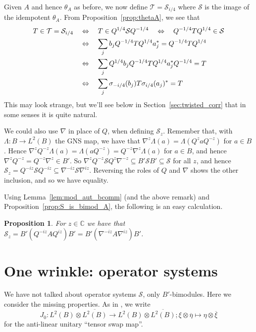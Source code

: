 \documentclass[a4paper,11pt]{article}
\theoremstyle{plain}
\newtheorem{proposition}{Proposition}[section]
\theoremstyle{remark}
\newenvironment{remark}
  {\pushQED{\qed}\renewcommand{\qedsymbol}{$\triangle$}\remarkx}
  {\popQED\endremarkx}
\newcommand{\mc}[1]{\mathcal{#1}}
\begin{document}
Given $A$ and hence $\theta_A$ as before, we now define $\mc T = \mc S_{i/4}$ where $\mc S$ is the image of the idempotent $\theta_A$.  From Proposition~\ref{prop:thetaA}, we see that
\begin{align}
T\in\mc T = \mc S_{i/4}
&\quad\Leftrightarrow\quad
T \in Q^{1/4} \mc S Q^{-1/4}
\quad\Leftrightarrow\quad
Q^{-1/4} T Q^{1/4} \in \mc S   \notag \\
&\quad\Leftrightarrow\quad
\sum_j b_j Q^{-1/4} T Q^{1/4} a_j^* = Q^{-1/4} T Q^{1/4}  \notag \\
&\quad\Leftrightarrow\quad
\sum_j Q^{1/4} b_j Q^{-1/4} T Q^{1/4} a_j^*Q^{-1/4} = T    \notag \\
&\quad\Leftrightarrow\quad
\sum_j \sigma_{-i/4}(b_j) T \sigma_{i/4}(a_j)^* = T
\label{eq:twistedT}
\end{align}
This may look strange, but we'll see below in Section~\ref{sec:twisted_corr} that in some senses it is quite natural.

\begin{remark}
We could also use $\nabla$ in place of $Q$, when defining $\mc S_z$.  Remember that, with $\Lambda \colon B \to L^2(B)$ the GNS map, we have that $\nabla^z\Lambda(a) = \Lambda(Q^zaQ^{-z})$ for $a\in B$.  Hence $\nabla^z Q^{-z} \Lambda(a) = \Lambda(a Q^{-z}) = Q^{-z} \nabla^z \Lambda(a)$ for $a\in B$, and hence $\nabla^z Q^{-z} = Q^{-z} \nabla^z \in B'$.  So $\nabla^z Q^{-z} \mc S Q^z \nabla^{-z} \subseteq B' \mc S B' \subseteq \mc S$ for all $z$, and hence $\mc S_z = Q^{-iz} \mc S Q^{-iz} \subseteq \nabla^{-iz} \mc S \nabla^{iz}$.  Reversing the roles of $Q$ and $\nabla$ shows the other inclusion, and so we have equality.
\end{remark}

Using Lemma~\ref{lem:mod_aut_bcomm} (and the above remark) and Proposition~\ref{prop:S_is_bimod_A}, the following is an easy calculation.

\begin{proposition}
For $z\in\mathbb C$ we have that $\mc S_z = B' (Q^{-iz}AQ^{iz}) B' = B' (\nabla^{-iz}A\nabla^{iz}) B'$.
\end{proposition}



\section{One wrinkle: operator systems}

We have not talked about operator systems $\mc S$, only $B'$-bimodules.  Here we consider the missing properties.
As in \cite[Definition~5.11]{daws_quantum_graphs}, we write
\[ J_0 \colon L^2(B) \otimes \overline{L^2(B)} \to L^2(B) \otimes \overline{L^2(B)}; \xi \otimes \overline\eta \mapsto \eta \otimes \overline\xi \]
for the anti-linear unitary ``tensor swap map''.
\end{document}
